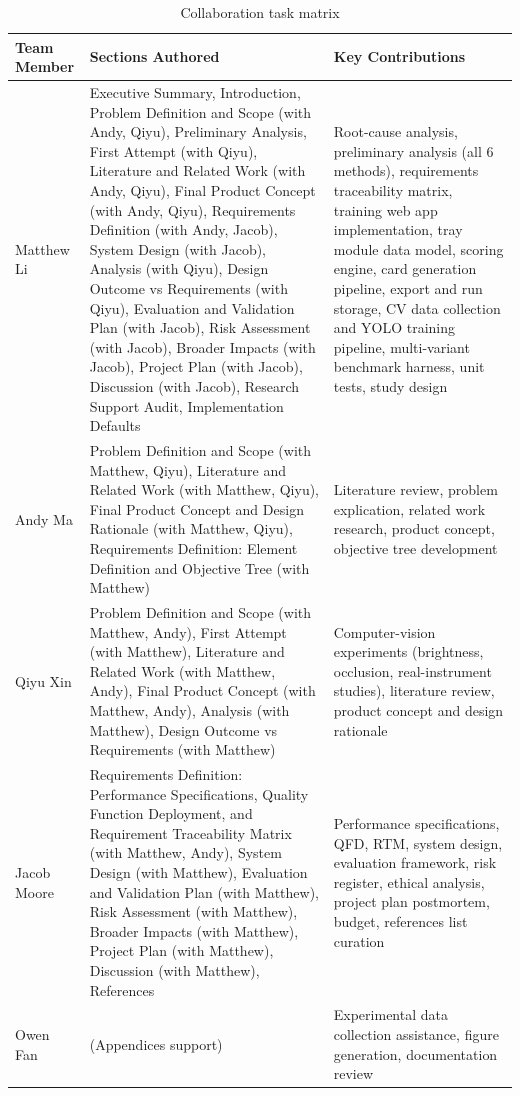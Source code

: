 \documentclass[10pt,a4paper]{article}
\begin{document}
\begin{table}[H]
\centering
\caption{Collaboration task matrix}
\label{tab:collaboration-task-matrix}
\small\renewcommand{\arraystretch}{1.3}\setlength{\tabcolsep}{3pt}
\begin{tabularx}{\textwidth}{|>{\raggedright\arraybackslash}p{2.2cm}|>{\raggedright\arraybackslash}X|>{\raggedright\arraybackslash}X|}
\hline
Team Member & Sections Authored & Key Contributions \\
\hline
Matthew Li & Executive Summary, Introduction, Problem Definition and Scope (with Andy, Qiyu), Preliminary Analysis, First Attempt (with Qiyu), Literature and Related Work (with Andy, Qiyu), Final Product Concept (with Andy, Qiyu), Requirements Definition (with Andy, Jacob), System Design (with Jacob), Analysis (with Qiyu), Design Outcome vs Requirements (with Qiyu), Evaluation and Validation Plan (with Jacob), Risk Assessment (with Jacob), Broader Impacts (with Jacob), Project Plan (with Jacob), Discussion (with Jacob), Research Support Audit, Implementation Defaults & Root-cause analysis, preliminary analysis (all 6 methods), requirements traceability matrix, training web app implementation, tray module data model, scoring engine, card generation pipeline, export and run storage, CV data collection and YOLO training pipeline, multi-variant benchmark harness, unit tests, study design \\
\hline
Andy Ma & Problem Definition and Scope (with Matthew, Qiyu), Literature and Related Work (with Matthew, Qiyu), Final Product Concept and Design Rationale (with Matthew, Qiyu), Requirements Definition: Element Definition and Objective Tree (with Matthew) & Literature review, problem explication, related work research, product concept, objective tree development \\
\hline
Qiyu Xin & Problem Definition and Scope (with Matthew, Andy), First Attempt (with Matthew), Literature and Related Work (with Matthew, Andy), Final Product Concept (with Matthew, Andy), Analysis (with Matthew), Design Outcome vs Requirements (with Matthew) & Computer-vision experiments (brightness, occlusion, real-instrument studies), literature review, product concept and design rationale \\
\hline
Jacob Moore & Requirements Definition: Performance Specifications, Quality Function Deployment, and Requirement Traceability Matrix (with Matthew, Andy), System Design (with Matthew), Evaluation and Validation Plan (with Matthew), Risk Assessment (with Matthew), Broader Impacts (with Matthew), Project Plan (with Matthew), Discussion (with Matthew), References & Performance specifications, QFD, RTM, system design, evaluation framework, risk register, ethical analysis, project plan postmortem, budget, references list curation \\
\hline
Owen Fan & (Appendices support) & Experimental data collection assistance, figure generation, documentation review \\
\hline
\end{tabularx}
\end{table}
\end{document}
